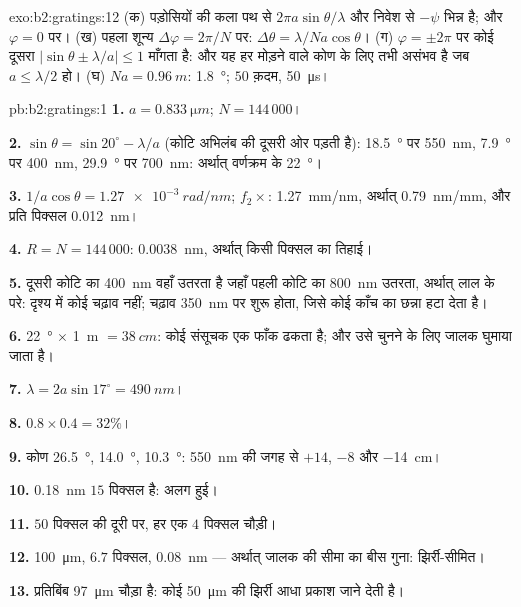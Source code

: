 \begin{solution}{exo:b2:gratings:12}
(क) पड़ोसियों की कला पथ से $2\pi a\sin\theta/\lambda$ और निवेश से $-\psi$
भिन्न है; और  $\varphi = 0$ पर। (ख) पहला शून्य
$\Delta\varphi = 2\pi/N$ पर: $\Delta\theta = \lambda/Na\cos\theta$। (ग) $\varphi = \pm2\pi$ पर कोई दूसरा 
$|\sin\theta \pm \lambda/a| \le 1$ माँगता है: और यह हर मोड़ने वाले कोण के लिए तभी असंभव है
जब $a \le \lambda/2$ हो। (घ) $Na = \qty{0.96}{m}$: \qty{1.8}{\degree}; $50$ क़दम,
\qty{50}{\micro s}।
\end{solution}

\begin{solution}{pb:b2:gratings:1}
\textbf{1.} $a = \qty{0.833}{\micro m}$; $N = 144\,000$।

\textbf{2.} $\sin\theta = \sin20^\circ - \lambda/a$ (कोटि अभिलंब की दूसरी ओर पड़ती
है): \qty{18.5}{\degree} पर \qty{550}{nm}, \qty{7.9}{\degree} पर \qty{400}{nm}, \qty{29.9}{\degree} पर
\qty{700}{nm}: अर्थात् वर्णक्रम के \qty{22}{\degree}।

\textbf{3.} $1/a\cos\theta = \qty{1.27e-3}{rad/nm}$; $f_2\times$: \qty{1.27}{mm/nm}, अर्थात्
\qty{0.79}{nm/mm}, और प्रति पिक्सल \qty{0.012}{nm}।

\textbf{4.} $R = N = 144\,000$: \qty{0.0038}{nm}, अर्थात् किसी पिक्सल का तिहाई।

\textbf{5.} दूसरी कोटि का \qty{400}{nm} वहाँ उतरता है जहाँ पहली कोटि का \qty{800}{nm}
उतरता, अर्थात् लाल के परे: दृश्य में कोई चढ़ाव नहीं; चढ़ाव
\qty{350}{nm} पर शुरू होता, जिसे कोई काँच का छन्ना हटा देता है।

\textbf{6.} \qty{22}{\degree} $\times$ \qty{1}{m} $= \qty{38}{cm}$: कोई संसूचक एक फाँक ढकता है;
और उसे चुनने के लिए जालक घुमाया जाता है।

\textbf{7.} $\lambda = 2a\sin17^\circ = \qty{490}{nm}$।

\textbf{8.} $0.8 \times 0.4 = 32\%$।

\textbf{9.} कोण \qty{26.5}{\degree}, \qty{14.0}{\degree}, \qty{10.3}{\degree}: \qty{550}{nm} की जगह से $+14$, $-8$ और
\qty{-14}{cm}।

\textbf{10.} \qty{0.18}{nm} $15$ पिक्सल है: अलग हुई।

\textbf{11.} $50$ पिक्सल की दूरी पर, हर एक $4$ पिक्सल चौड़ी।

\textbf{12.} \qty{100}{\micro m}, $6.7$ पिक्सल, \qty{0.08}{nm} --- अर्थात् जालक की सीमा का
बीस गुना: झिर्री-सीमित।

\textbf{13.} प्रतिबिंब \qty{97}{\micro m} चौड़ा है: कोई \qty{50}{\micro m} की झिर्री
आधा प्रकाश जाने देती है।


\end{solution}
